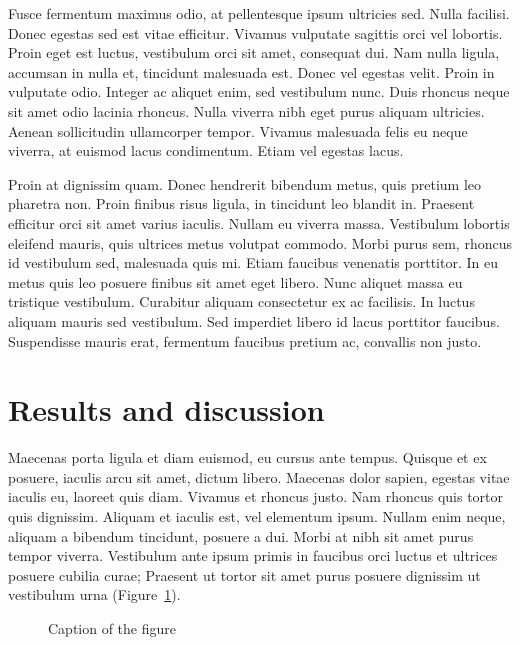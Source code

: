 \documentclass[final,5p,times,twocolumn]{elsarticle}
\begin{document}
Fusce fermentum maximus odio, at pellentesque ipsum ultricies sed. Nulla facilisi. Donec egestas sed est vitae efficitur. Vivamus vulputate sagittis orci vel lobortis. Proin eget est luctus, vestibulum orci sit amet, consequat dui. Nam nulla ligula, accumsan in nulla et, tincidunt malesuada est. Donec vel egestas velit. Proin in vulputate odio. Integer ac aliquet enim, sed vestibulum nunc. Duis rhoncus neque sit amet odio lacinia rhoncus. Nulla viverra nibh eget purus aliquam ultricies. Aenean sollicitudin ullamcorper tempor. Vivamus malesuada felis eu neque viverra, at euismod lacus condimentum. Etiam vel egestas lacus.

Proin at dignissim quam. Donec hendrerit bibendum metus, quis pretium leo pharetra non. Proin finibus risus ligula, in tincidunt leo blandit in. Praesent efficitur orci sit amet varius iaculis. Nullam eu viverra massa. Vestibulum lobortis eleifend mauris, quis ultrices metus volutpat commodo. Morbi purus sem, rhoncus id vestibulum sed, malesuada quis mi. Etiam faucibus venenatis porttitor. In eu metus quis leo posuere finibus sit amet eget libero. Nunc aliquet massa eu tristique vestibulum. Curabitur aliquam consectetur ex ac facilisis. In luctus aliquam mauris sed vestibulum. Sed imperdiet libero id lacus porttitor faucibus. Suspendisse mauris erat, fermentum faucibus pretium ac, convallis non justo.

\section{Results and discussion}
\label{sec:res}

Maecenas porta ligula et diam euismod, eu cursus ante tempus. Quisque et ex posuere, iaculis arcu sit amet, dictum libero. Maecenas dolor sapien, egestas vitae iaculis eu, laoreet quis diam. Vivamus et rhoncus justo. Nam rhoncus quis tortor quis dignissim. Aliquam et iaculis est, vel elementum ipsum. Nullam enim neque, aliquam a bibendum tincidunt, posuere a dui. Morbi at nibh sit amet purus tempor viverra. Vestibulum ante ipsum primis in faucibus orci luctus et ultrices posuere cubilia curae; Praesent ut tortor sit amet purus posuere dignissim ut vestibulum urna (Figure~\ref{fig:e}).

\begin{figure}[ht]
    \centering
    \caption{Caption of the figure}
    \label{fig:e}
\end{figure}
\end{document}
